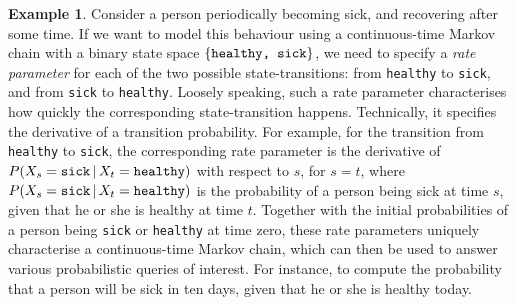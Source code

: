 \documentclass[10pt,a4paper]{paper}
\theoremstyle{definition}
\newtheorem{exmp}{Example}%
\begin{document}
\begin{exmp}\label{ex:health_sick_exmp}
Consider a person periodically becoming sick, and recovering after some time. If we want to model this behaviour using a continuous-time Markov chain with a binary state space $\{\text{\tt healthy, sick}\}$, we need to specify a \emph{rate parameter} for each of the two possible state-transitions: from {\tt healthy} to {\tt sick}, and from {\tt sick} to {\tt healthy}. Loosely speaking, such a rate parameter characterises how quickly the corresponding state-transition happens. Technically, it specifies the derivative of a transition probability. For example, for the transition from {\tt healthy} to {\tt sick}, the corresponding rate parameter is the derivative of $P(X_s={\tt sick}\,\vert\,X_t={\tt healthy})$ with respect to $s$, for $s=t$, where $P(X_s={\tt sick}\,\vert\,X_t={\tt healthy})$ is the probability of a person being sick at time $s$, given that he or she is healthy at time $t$. Together with the initial probabilities of a person being {\tt sick} or {\tt healthy} at time zero, these rate parameters uniquely characterise a continuous-time Markov chain, which can then be used to answer various probabilistic queries of interest.
For instance, to compute the probability that a person will be sick in ten days, given that he or she is healthy today.


\end{exmp}
\end{document}
